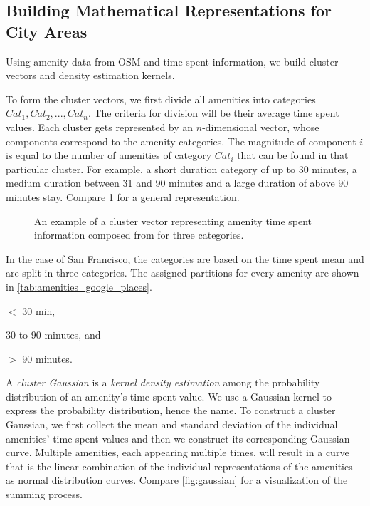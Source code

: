 	\subsection{Building Mathematical Representations for City Areas}
	Using amenity data from OSM and time-spent information, we build cluster vectors and density estimation kernels.
	
	To form the cluster vectors, we first divide all amenities into categories $Cat_1, Cat_2, ..., Cat_n$. The criteria for division will be their average time spent values. Each cluster gets represented by an $n$-dimensional vector, whose components correspond to the amenity categories. The magnitude of component $i$ is equal to the number of amenities of category $Cat_i$ that can be found in that particular cluster. For example, a short duration category of up to 30 minutes, a medium duration between 31 and 90 minutes and a large duration of above 90 minutes stay. Compare \cref{fig:cluster_vector} for a general representation.
	
	\begin{figure}[!ht]
		\centering
		
		\caption{An example of a cluster vector representing amenity time spent information composed from for three categories.}
		\label{fig:cluster_vector}
	\end{figure}
	
	In the case of San Francisco, the categories are based on the time spent mean and are split in three categories. The assigned partitions for every amenity are shown in \cref{tab:amenities_google_places}.
	\begin{romanlist}
		\item $<$ 30 min,
		\item 30 to 90 minutes, and
		\item $>$ 90 minutes. 
	\end{romanlist}
	
	A \textit{cluster Gaussian} is a \textit{kernel density estimation} among the probability distribution of an amenity's time spent value. We use a Gaussian kernel to express the probability distribution, hence the name. To construct a cluster Gaussian, we first collect the mean and standard deviation of the individual amenities' time spent values and then we construct its corresponding Gaussian curve. Multiple amenities, each appearing multiple times, will result in a curve that is the linear combination of the individual representations of the amenities as normal distribution curves. Compare \cref{fig:gaussian} for a visualization of the summing process.
	
